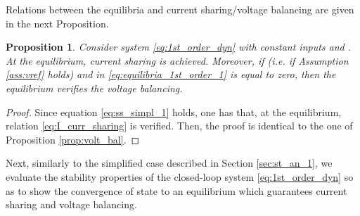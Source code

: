 \documentclass[a4paper]{article}
\theoremstyle{plain}
\newtheorem{prp}{Proposition}
\begin{document}
Relations between the equilibria and current sharing/voltage balancing are given in the next Proposition.
\begin{prp}
	\label{prop:volt_bal_2}
	Consider system \eqref{eq:1st_order_dyn} with constant inputs
	 and . At the equilibrium,
	current sharing is achieved. Moreover, if  (i.e. if Assumption \ref{ass:vref} holds) and
	 in \eqref{eq:equilibria_1st_order_1} is equal to zero, then
	the equilibrium  verifies the voltage balancing.
\end{prp}
\begin{proof}
	Since equation \eqref{eq:ss_simpl_1} holds, one has that, at the
	equilibrium, relation \eqref{eq:I_curr_sharing} is verified. Then, the
	proof is  identical to the one of Proposition \ref{prop:volt_bal}.
\end{proof}
Next, similarly to the simplified case described in Section \ref{sec:st_an_1}, we evaluate the stability properties of the closed-loop system \eqref{eq:1st_order_dyn} so as to show the convergence of state  to an equilibrium which guarantees current sharing and voltage balancing.
\end{document}
